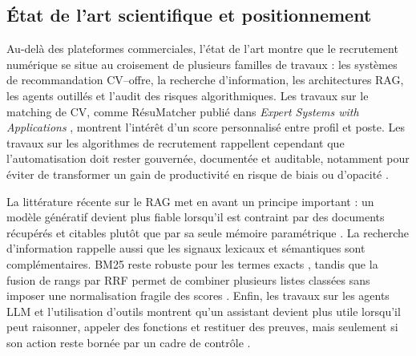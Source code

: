 \subsection{État de l'art scientifique et positionnement}
Au-delà des plateformes commerciales, l'état de l'art montre que le recrutement numérique se situe au croisement de plusieurs familles de travaux : les systèmes de recommandation CV--offre, la recherche d'information, les architectures RAG, les agents outillés et l'audit des risques algorithmiques. Les travaux sur le matching de CV, comme RésuMatcher publié dans \textit{Expert Systems with Applications} , montrent l'intérêt d'un score personnalisé entre profil et poste. Les travaux sur les algorithmes de recrutement rappellent cependant que l'automatisation doit rester gouvernée, documentée et auditable, notamment pour éviter de transformer un gain de productivité en risque de biais ou d'opacité .

La littérature récente sur le RAG met en avant un principe important : un modèle génératif devient plus fiable lorsqu'il est contraint par des documents récupérés et citables plutôt que par sa seule mémoire paramétrique . La recherche d'information rappelle aussi que les signaux lexicaux et sémantiques sont complémentaires. BM25 reste robuste pour les termes exacts , tandis que la fusion de rangs par RRF permet de combiner plusieurs listes classées sans imposer une normalisation fragile des scores . Enfin, les travaux sur les agents LLM et l'utilisation d'outils montrent qu'un assistant devient plus utile lorsqu'il peut raisonner, appeler des fonctions et restituer des preuves, mais seulement si son action reste bornée par un cadre de contrôle .

